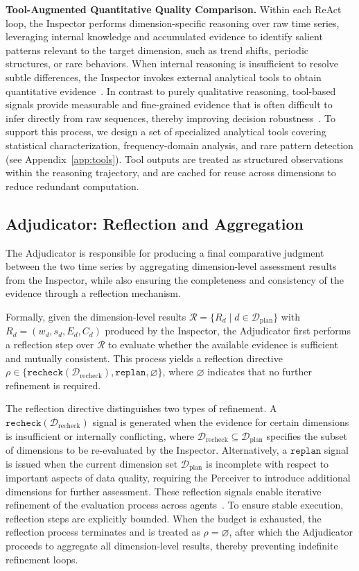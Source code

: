 \documentclass{article}
\newcommand{\partitle}[1]{\smallskip \noindent \textbf{#1.}}
\begin{document}
\partitle{Tool-Augmented Quantitative Quality Comparison}
Within each ReAct loop, the Inspector performs dimension-specific reasoning over raw time series, leveraging internal knowledge and accumulated evidence to identify salient patterns relevant to the target dimension, such as trend shifts, periodic structures, or rare behaviors. When internal reasoning is insufficient to resolve subtle differences, the Inspector invokes external analytical tools to obtain quantitative evidence~\citep{qian2025smart,schick2023toolformer}. In contrast to purely qualitative reasoning, tool-based signals provide measurable and fine-grained evidence that is often difficult to infer directly from raw sequences, thereby improving decision robustness~\citep{wu2026timeart}.
To support this process, we design a set of specialized analytical tools covering statistical characterization, frequency-domain analysis, and rare pattern detection (see Appendix~\ref{app:tools}). Tool outputs are treated as structured observations within the reasoning trajectory, and are cached for reuse across dimensions to reduce redundant computation.


\subsection{Adjudicator: Reflection and Aggregation}

The Adjudicator is responsible for producing a final comparative judgment between the two time series by aggregating dimension-level assessment results from the Inspector, while also ensuring the completeness and consistency of the evidence through a reflection mechanism.

Formally, given the dimension-level results $\mathcal{R} = \{R_d \mid d \in \mathcal{D}_{\text{plan}}\}$ with $R_d = (w_d, s_d, E_d, C_d)$ produced by the Inspector, the Adjudicator first performs a reflection step over $\mathcal{R}$ to evaluate whether the available evidence is sufficient and mutually consistent. This process yields a reflection directive $\rho \in \{\texttt{recheck}(\mathcal{D}_{\text{recheck}}), \texttt{replan}, \varnothing\}$, where $\varnothing$ indicates that no further refinement is required.

The reflection directive distinguishes two types of refinement. A $\texttt{recheck}(\mathcal{D}_{\text{recheck}})$ signal is generated when the evidence for certain dimensions is insufficient or internally conflicting, where $\mathcal{D}_{\text{recheck}} \subseteq \mathcal{D}_{\text{plan}}$ specifies the subset of dimensions to be re-evaluated by the Inspector. Alternatively, a $\texttt{replan}$ signal is issued when the current dimension set $\mathcal{D}_{\text{plan}}$ is incomplete with respect to important aspects of data quality, requiring the Perceiver to introduce additional dimensions for further assessment. These reflection signals enable iterative refinement of the evaluation process across agents~\citep{shinn2023reflexion}. To ensure stable execution, reflection steps are explicitly bounded. When the budget is exhausted, the reflection process terminates and is treated as $\rho = \varnothing$, after which the Adjudicator proceeds to aggregate all dimension-level results, thereby preventing indefinite refinement loops.
\end{document}
